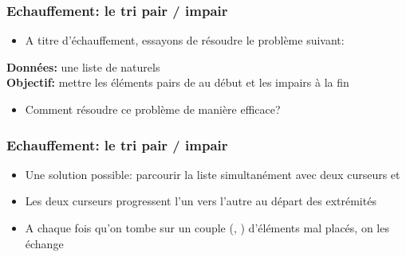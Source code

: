 \documentclass[12pt]{linfo-beamer}
\begin{document}
\begin{frame}
    \frametitle{Echauffement: le tri pair / impair}
\begin{itemize}
    \item A titre d'échauffement, essayons de résoudre le problème suivant:
\end{itemize}
  \begin{probleme}\small
    \textbf{Données:} une liste  de naturels\\
    \textbf{Objectif:} mettre les éléments pairs de  au début et les impairs à la fin
  \end{probleme}
\begin{itemize}
    \item Comment résoudre ce problème de manière efficace?
\end{itemize}
\end{frame}


\begin{frame}
    \frametitle{Echauffement: le tri pair / impair}
\begin{itemize}
    \item Une solution possible: parcourir la liste simultanément avec deux curseurs  et 
    \item Les deux curseurs progressent l'un vers l'autre au départ des extrémités
    \item A chaque fois qu'on tombe sur un couple (, ) d'éléments mal placés, on les échange
\end{itemize}
\vfill
    \begin{center}
    \end{center}
\end{frame}
\end{document}
